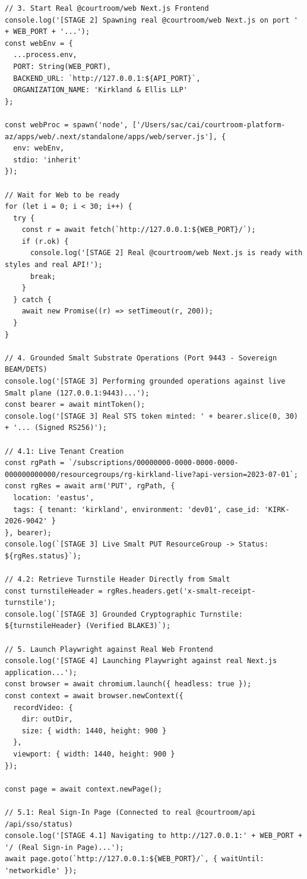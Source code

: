 \documentclass[10pt,twoside,openany]{book}
\theoremstyle{plain}
\theoremstyle{definition}
\theoremstyle{remark}
\begin{document}
\begin{lstlisting}[caption={scripts/run\_zero\_mock\_playwright.mjs}]
// 3. Start Real @courtroom/web Next.js Frontend
console.log('[STAGE 2] Spawning real @courtroom/web Next.js on port ' + WEB_PORT + '...');
const webEnv = {
  ...process.env,
  PORT: String(WEB_PORT),
  BACKEND_URL: `http://127.0.0.1:${API_PORT}`,
  ORGANIZATION_NAME: 'Kirkland & Ellis LLP'
};

const webProc = spawn('node', ['/Users/sac/cai/courtroom-platform-az/apps/web/.next/standalone/apps/web/server.js'], {
  env: webEnv,
  stdio: 'inherit'
});

// Wait for Web to be ready
for (let i = 0; i < 30; i++) {
  try {
    const r = await fetch(`http://127.0.0.1:${WEB_PORT}/`);
    if (r.ok) {
      console.log('[STAGE 2] Real @courtroom/web Next.js is ready with styles and real API!');
      break;
    }
  } catch {
    await new Promise((r) => setTimeout(r, 200));
  }
}

// 4. Grounded Smalt Substrate Operations (Port 9443 - Sovereign BEAM/DETS)
console.log('[STAGE 3] Performing grounded operations against live Smalt plane (127.0.0.1:9443)...');
const bearer = await mintToken();
console.log('[STAGE 3] Real STS token minted: ' + bearer.slice(0, 30) + '... (Signed RS256)');

// 4.1: Live Tenant Creation
const rgPath = `/subscriptions/00000000-0000-0000-0000-000000000000/resourcegroups/rg-kirkland-live?api-version=2023-07-01`;
const rgRes = await arm('PUT', rgPath, {
  location: 'eastus',
  tags: { tenant: 'kirkland', environment: 'dev01', case_id: 'KIRK-2026-9042' }
}, bearer);
console.log(`[STAGE 3] Live Smalt PUT ResourceGroup -> Status: ${rgRes.status}`);

// 4.2: Retrieve Turnstile Header Directly from Smalt
const turnstileHeader = rgRes.headers.get('x-smalt-receipt-turnstile');
console.log(`[STAGE 3] Grounded Cryptographic Turnstile: ${turnstileHeader} (Verified BLAKE3)`);

// 5. Launch Playwright against Real Web Frontend
console.log('[STAGE 4] Launching Playwright against real Next.js application...');
const browser = await chromium.launch({ headless: true });
const context = await browser.newContext({
  recordVideo: {
    dir: outDir,
    size: { width: 1440, height: 900 }
  },
  viewport: { width: 1440, height: 900 }
});

const page = await context.newPage();

// 5.1: Real Sign-In Page (Connected to real @courtroom/api /api/sso/status)
console.log('[STAGE 4.1] Navigating to http://127.0.0.1:' + WEB_PORT + '/ (Real Sign-in Page)...');
await page.goto(`http://127.0.0.1:${WEB_PORT}/`, { waitUntil: 'networkidle' });


\end{lstlisting}
\end{document}
